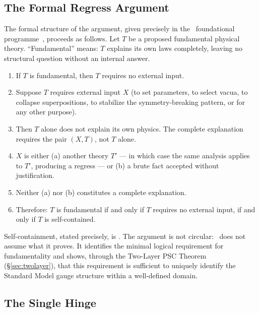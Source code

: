 \documentclass[11pt,openany]{book}
\theoremstyle{remark}
\newcommand{\PSC}{\text{PSC}}
\newcommand{\NEMS}{\text{NEMS}}
\begin{document}
\subsection*{The Formal Regress Argument}

The formal structure of the argument, given precisely in the \NEMS\ foundational
programme~\cite{SpivackNEMS05}, proceeds as follows. Let $T$ be a proposed fundamental
physical theory. ``Fundamental'' means: $T$ explains its own laws completely, leaving
no structural question without an internal answer.

\begin{enumerate}[leftmargin=1.8cm,label=\arabic*.]
\item If $T$ is fundamental, then $T$ requires no external input.
\item Suppose $T$ requires external input $X$ (to set parameters, to select vacua, to
  collapse superpositions, to stabilize the symmetry-breaking pattern, or for any other
  purpose).
\item Then $T$ alone does not explain its own physics. The complete explanation requires
  the pair $(X, T)$, not $T$ alone.
\item $X$ is either (a) another theory $T'$ --- in which case the same analysis applies
  to $T'$, producing a regress --- or (b) a brute fact accepted without justification.
\item Neither (a) nor (b) constitutes a complete explanation.
\item Therefore: $T$ is fundamental if and only if $T$ requires no external input, if
  and only if $T$ is self-contained.
\end{enumerate}

Self-containment, stated precisely, is \PSC. The argument is not circular: \PSC\ does
not assume what it proves. It identifies the minimal logical requirement for
fundamentality and shows, through the Two-Layer PSC Theorem (\S\ref{sec:twolayer}),
that this requirement is sufficient to uniquely identify the Standard Model gauge
structure within a well-defined domain.

\subsection*{The Single Hinge}
\end{document}
